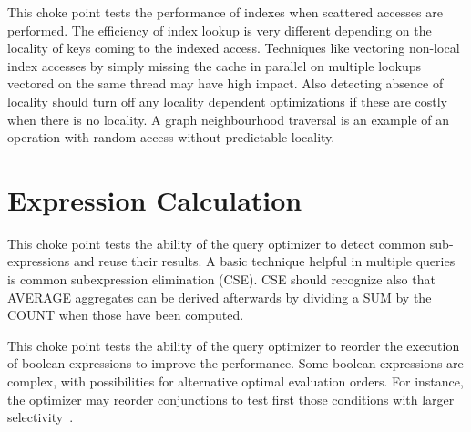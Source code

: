 This choke point tests the performance of indexes when scattered accesses are performed. The efficiency of index lookup is very different depending on the locality of keys coming to the indexed access.
Techniques like vectoring non-local index accesses by simply missing the cache in parallel on multiple lookups vectored on the same thread may have high impact.
Also detecting absence of locality should turn off any locality dependent optimizations if these are costly when there is no locality. A graph neighbourhood traversal is an example of an operation with random access without predictable locality.




\section{Expression Calculation}



This choke point tests the ability of the query optimizer to detect common sub-expressions and reuse their results. A basic technique helpful in multiple queries is common subexpression elimination (CSE).
CSE should recognize also that AVERAGE aggregates can be derived afterwards by dividing a SUM by the COUNT when those have been computed.





This choke point tests the ability of the query optimizer to reorder the execution of boolean expressions to improve the performance. Some boolean expressions are complex, with possibilities for alternative optimal evaluation orders.
For instance, the optimizer may reorder conjunctions to test first those conditions with larger selectivity~\cite{DBLP:conf/vldb/Moerkotte98}.



